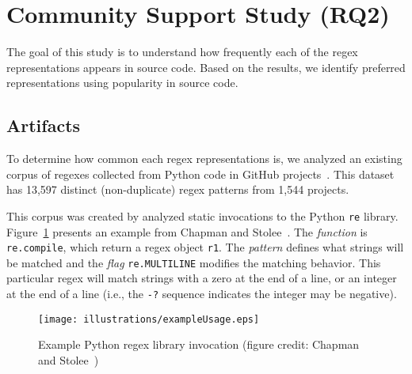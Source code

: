 
\section{Community Support Study (RQ2)}
\label{communitystudy}
The goal of this study is to understand how frequently each of the regex representations appears in source code. Based on the results, we identify preferred representations using popularity in source code.



\subsection{Artifacts}
To determine how common each regex representations is, we analyzed an existing
corpus of regexes collected from Python code in GitHub projects~\cite{chapman2016}. 
This dataset has  13,597 distinct (non-duplicate) regex patterns from 1,544 projects.

This corpus was created by analyzed static invocations to the Python {\tt re} library.
Figure~\ref{fig:exampleUsage} presents an example from Chapman and Stolee~\cite{chapman2016}. The \emph{function} is {\tt re.compile}, which return a regex object {\tt r1}.
The \emph{pattern} defines what strings will be matched and the \emph{flag} {\tt re.MULTILINE} modifies the matching behavior.
This particular regex will  match strings with a zero at the end of a line, or an integer at the end of a line (i.e., the {\tt -?} sequence indicates the integer may be negative).

\begin{figure}[tb]
\centering
\texttt{[image: illustrations/exampleUsage.eps]}
\vspace{-12pt}
\caption{Example Python  regex library invocation (figure credit: Chapman and Stolee~\cite{chapman2016})}
\vspace{-6pt}
\label{fig:exampleUsage}
\end{figure}



